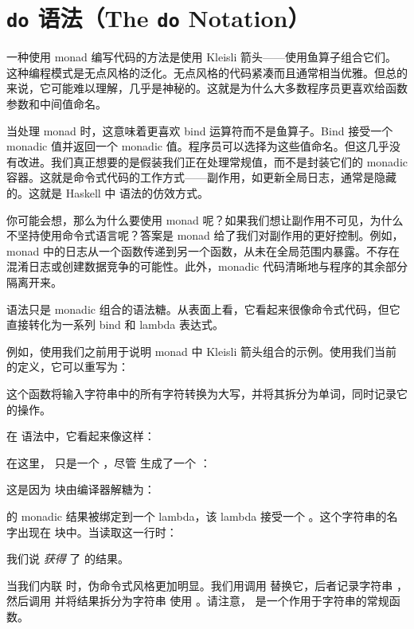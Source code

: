 
\section{\texttt{do} 语法（The \texttt{do} Notation）}

一种使用 monad 编写代码的方法是使用 Kleisli 箭头——使用鱼算子组合它们。这种编程模式是无点风格的泛化。无点风格的代码紧凑而且通常相当优雅。但总的来说，它可能难以理解，几乎是神秘的。这就是为什么大多数程序员更喜欢给函数参数和中间值命名。

当处理 monad 时，这意味着更喜欢 bind 运算符而不是鱼算子。Bind 接受一个 monadic 值并返回一个 monadic 值。程序员可以选择为这些值命名。但这几乎没有改进。我们真正想要的是假装我们正在处理常规值，而不是封装它们的 monadic 容器。这就是命令式代码的工作方式——副作用，如更新全局日志，通常是隐藏的。这就是 Haskell 中  语法的仿效方式。

你可能会想，那么为什么要使用 monad 呢？如果我们想让副作用不可见，为什么不坚持使用命令式语言呢？答案是 monad 给了我们对副作用的更好控制。例如， monad 中的日志从一个函数传递到另一个函数，从未在全局范围内暴露。不存在混淆日志或创建数据竞争的可能性。此外，monadic 代码清晰地与程序的其余部分隔离开来。

 语法只是 monadic 组合的语法糖。从表面上看，它看起来很像命令式代码，但它直接转化为一系列 bind 和 lambda 表达式。

例如，使用我们之前用于说明  monad 中 Kleisli 箭头组合的示例。使用我们当前的定义，它可以重写为：

这个函数将输入字符串中的所有字符转换为大写，并将其拆分为单词，同时记录它的操作。

在  语法中，它看起来像这样：

在这里， 只是一个 ，尽管  生成了一个 ：

这是因为  块由编译器解糖为：

 的 monadic 结果被绑定到一个 lambda，该 lambda 接受一个 。这个字符串的名字出现在  块中。当读取这一行时：

我们说  \emph{获得} 了  的结果。

当我们内联  时，伪命令式风格更加明显。我们用调用  替换它，后者记录字符串 ，然后调用  并将结果拆分为字符串  使用 。请注意， 是一个作用于字符串的常规函数。

